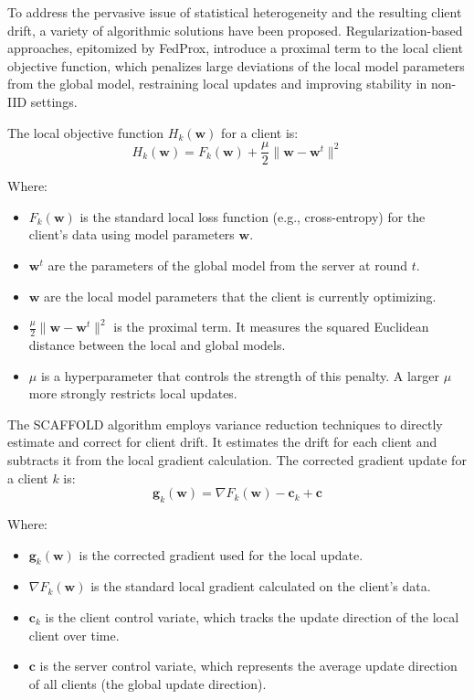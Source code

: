 \documentclass[conference]{IEEEtran}
\begin{document}
To address the pervasive issue of statistical heterogeneity and the resulting client drift, a variety of algorithmic solutions have been proposed.  Regularization-based approaches, epitomized by FedProx, introduce a proximal term to the local client objective function, which penalizes large deviations of the local model parameters from the global model, restraining local updates and improving stability in non-IID settings.

The local objective function $H_k(\mathbf{w})$ for a client is:
$$ H_k(\mathbf{w}) = F_k(\mathbf{w}) + \frac{\mu}{2} \|\mathbf{w} - \mathbf{w}^t\|^2 $$

Where:
\begin{itemize}
    \item $F_k(\mathbf{w})$ is the standard local loss function (e.g., cross-entropy) for the client's data using model parameters $\mathbf{w}$.
    \item $\mathbf{w}^t$ are the parameters of the global model from the server at round $t$.
    \item $\mathbf{w}$ are the local model parameters that the client is currently optimizing.
    \item $\frac{\mu}{2} \|\mathbf{w} - \mathbf{w}^t\|^2$ is the proximal term. It measures the squared Euclidean distance between the local and global models.
    \item $\mu$ is a hyperparameter that controls the strength of this penalty. A larger $\mu$ more strongly restricts local updates.
\end{itemize}

The SCAFFOLD algorithm employs variance reduction techniques to directly estimate and correct for client drift. It estimates the drift for each client and subtracts it from the local gradient calculation.
The corrected gradient update for a client $k$ is:
$$ \mathbf{g}_k(\mathbf{w}) = \nabla F_k(\mathbf{w}) - \mathbf{c}_k + \mathbf{c} $$

Where:
\begin{itemize}
    \item $\mathbf{g}_k(\mathbf{w})$ is the corrected gradient used for the local update.
    \item $\nabla F_k(\mathbf{w})$ is the standard local gradient calculated on the client's data.
    \item $\mathbf{c}_k$ is the client control variate, which tracks the update direction of the local client over time.
    \item $\mathbf{c}$ is the server control variate, which represents the average update direction of all clients (the global update direction).
\end{itemize}
\end{document}
